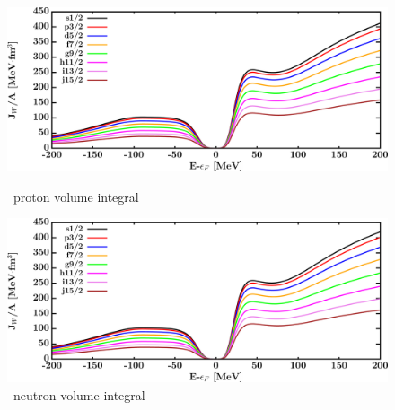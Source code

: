 \begin{figure}[hbtp]
    \centering
    \begin{minipage}{0.42\textwidth}
        \centering
        \includegraphics[width=\textwidth]{figures/o16_protonVolumeIntegrals.png}
        \caption*{\oSix\ proton volume integral}
        \label{DOMFitData_o16_proton_potentialIntegral}
    \end{minipage}\hspace{6pt}
    \begin{minipage}{0.42\textwidth}
        \centering
        \includegraphics[width=\textwidth]{figures/o16_neutronVolumeIntegrals.png}
        \caption*{\oSix\ neutron volume integral}
        \label{DOMFitData_o16_neutron_potentialIntegral}
    \end{minipage}
\end{figure}
